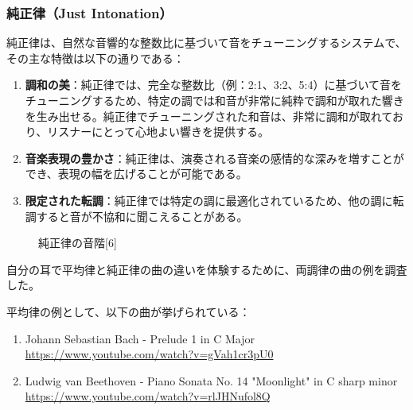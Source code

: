 \documentclass{article}
\begin{document}
\begin{spacing}{1.2}
        \subsubsection*{純正律（Just Intonation）}
        純正律は、自然な音響的な整数比に基づいて音をチューニングするシステムで、その主な特徴は以下の通りである：
        \begin{enumerate}[label=\arabic*), before=\begin{spacing}{1.2}, after=\end{spacing}] %
            \item \textbf{調和の美}：純正律では、完全な整数比（例：2:1、3:2、5:4）に基づいて音をチューニングするため、特定の調では和音が非常に純粋で調和が取れた響きを生み出せる。純正律でチューニングされた和音は、非常に調和が取れており、リスナーにとって心地よい響きを提供する。
            \item \textbf{音楽表現の豊かさ}：純正律は、演奏される音楽の感情的な深みを増すことができ、表現の幅を広げることが可能である。
            \item \textbf{限定された転調}：純正律では特定の調に最適化されているため、他の調に転調すると音が不協和に聞こえることがある。
        \end{enumerate}
        \begin{figure}[ht] %
            \centering
            \caption{純正律の音階[6]}
        \end{figure}
        \FloatBarrier
        \newpage
        自分の耳で平均律と純正律の曲の違いを体験するために、両調律の曲の例を調査した。
        
        平均律の例として、以下の曲が挙げられている：
        \begin{enumerate}[label=\arabic*), before=\begin{spacing}{1.2}, after=\end{spacing}] %
            \item Johann Sebastian Bach - Prelude 1 in C Major\\
            \url{https://www.youtube.com/watch?v=gVah1cr3pU0}
            \item Ludwig van Beethoven - Piano Sonata No. 14 "Moonlight" in C sharp minor\\
            \url{https://www.youtube.com/watch?v=rlJHNufol8Q}
        \end{enumerate}


\end{spacing}
\end{document}
